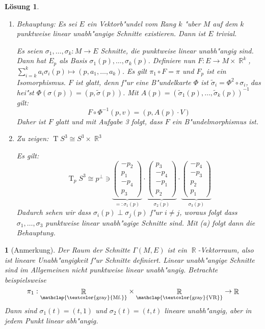 \documentclass[paper=A4, twoside, chapterprefix=true, bibliography=totoc, headsepline]{scrbook}
\DeclareMathOperator{\R}{\mathbb{R}}
\DeclareMathOperator{\T}{T}         %
\newcommand{\X}{\times}
\theoremstyle{plain}
\theoremstyle{nonumberplain}
\theoremstyle{empty}
\newtheorem{emptythm}{}%
\theoremstyle{break}
\newtheorem{Loes}{L\"osung}
\begin{document}
\begin{Loes}\begin{enumerate}[label=(\alph*),leftmargin=*,widest=a]
\item
	\emph{Behauptung:} Es sei $E$ ein Vektorb"undel vom Rang $k$ "uber $M$ auf dem $k$ punktweise linear unabh"angige Schnitte existieren. Dann ist $E$ trivial.
	
	Es seien $\sigma_1, \ldots, \sigma_k: M \to E$ Schnitte, die punktweise linear unabh"angig sind. Dann hat $E_p$ als Basis $\sigma_1(p),\ldots ,\sigma_k(p)$. Definiere nun $F: E \to M \X \R^k$, $\sum_{i=k}^k a_i \sigma_i(p) \mapsto (p, a_1,\ldots ,a_k)$. Es gilt $\pi_1 \circ F = \pi$ und $F_p$ ist ein Isomorphismus. $F$ ist glatt, denn f"ur eine B"undelkarte $\Phi$ ist $\tilde \sigma_i = \Phi^2 \circ \sigma_i$, das hei"st $\Phi(\sigma(p)) = (p, \tilde\sigma(p))$. Mit $A(p) = (\tilde\sigma_1(p),\ldots ,\tilde\sigma_k(p))^{-1}$ gilt:
	\[ F \circ \Phi^{-1}(p,v) = (p, A(p) \cdot V) \]
Daher ist $F$ glatt und mit Aufgabe 3 folgt, dass $F$ ein B"undelmorphismus ist.
\item
	\emph{Zu zeigen:} $\T S^3 \cong S^3 \X \R^3$
	
	Es gilt:
		\[ \T_pS^3 \cong p^\perp \ni \underbrace{\begin{pmatrix} -p_2 \\ p_1 \\ -p_4 \\ p_3 \end{pmatrix}}_{=:\sigma_1(p)} \cdot \underbrace{\begin{pmatrix} p_3 \\ -p_4 \\ -p_1 \\ p_2 \end{pmatrix}}_{\sigma_2(p)} \cdot \underbrace{\begin{pmatrix} -p_4 \\ -p_3 \\ p_2 \\ p_1 \end{pmatrix}}_{\sigma_3(p)} \]
	Dadurch sehen wir dass $\sigma_i(p) \perp \sigma_j(p)$ f"ur $ i \ne j$, woraus folgt dass $\sigma_1, \ldots ,\sigma_3$ punktweise linear unabh"agige Schnitte sind. Mit (a) folgt dann die Behauptung.
\end{enumerate}\end{Loes}

\begin{emptythm}[Anmerkung]
Der Raum der Schnitte $\Gamma(M,E)$ ist ein $\R$-Vektorraum, also ist lineare Unabh"angigkeit f"ur Schnitte definiert. Linear unabh"angige Schnitte sind im Allgemeinen \emph{nicht} punktweise linear unabh"angig. Betrachte beispielsweise
	\[ \pi_1: \underset{\mathclap{\text{\textcolor{gray}{Mf.}}}}{\R} \X \underset{\mathclap{\text{\textcolor{gray}{VR}}}}{\R} \to \R \]
Dann sind $\sigma_1(t) = (t,1)$ und $\sigma_2(t) = (t,t)$ lineare unabh"angig, aber in jedem Punkt linear abh"angig.
\end{emptythm}
\end{document}
